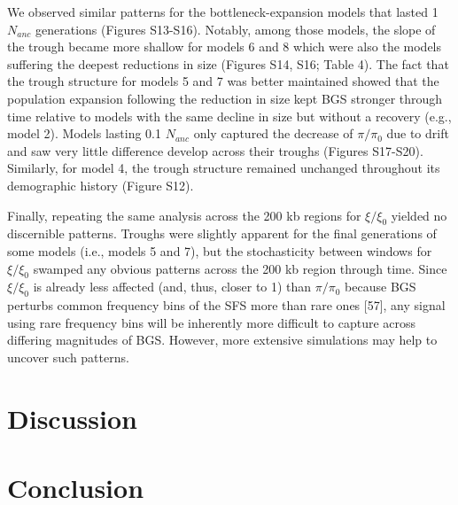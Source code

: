 \documentclass[9pt,twocolumn,twoside]{rilabRxiv}
\begin{document}
We observed similar patterns for the bottleneck-expansion models that
lasted 1 $N_{anc}$ generations (Figures S13-S16).
Notably, among those models, the slope of the trough became more shallow
for models 6 and 8 which were also the models suffering the deepest
reductions in size (Figures S14, S16; Table 4). The fact that the trough
structure for models 5 and 7 was better maintained showed that the
population expansion following the reduction in size kept BGS stronger
through time relative to models with the same decline in size but
without a recovery (e.g., model 2). Models lasting 0.1
$N_{anc}$ only captured the decrease of
$\pi/\pi_0$ due to drift and saw very little difference develop
across their troughs (Figures S17-S20). Similarly, for model 4, the
trough structure remained unchanged throughout its demographic history
(Figure S12).

Finally, repeating the same analysis across the 200 kb regions for
$\xi/\xi_0$ yielded no discernible patterns. Troughs were
slightly apparent for the final generations of some models (i.e., models
5 and 7), but the stochasticity between windows for $\xi/\xi_0$
swamped any obvious patterns across the 200 kb region through time.
Since $\xi/\xi_0$ is already less affected (and, thus, closer
to 1) than $\pi/\pi_0$ because BGS perturbs common frequency
bins of the SFS more than rare ones [57], any signal using rare
frequency bins will be inherently more difficult to capture across
differing magnitudes of BGS. However, more extensive simulations may
help to uncover such patterns.




\section{Discussion}

\section{Conclusion}
\end{document}
